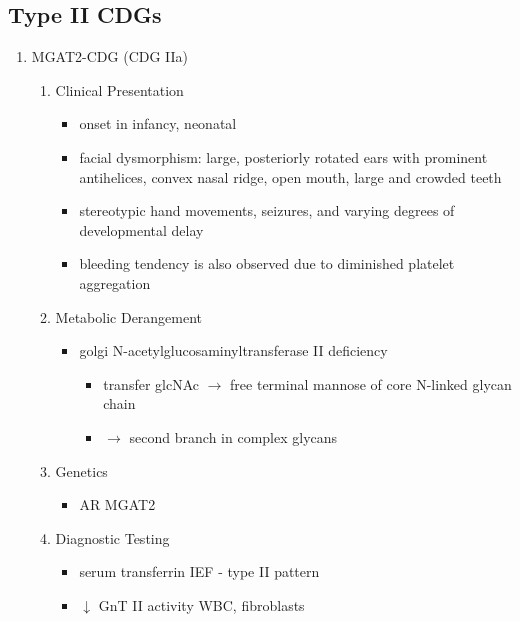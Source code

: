 \documentclass{scrartcl}
\begin{document}
\subsection{Type II CDGs}
\label{sec:org7c0118d}
\begin{enumerate}
\item MGAT2-CDG (CDG IIa)
\label{sec:orgb950941}
\begin{enumerate}
\item Clinical Presentation
\label{sec:org4b41c36}
\begin{itemize}
\item onset in infancy, neonatal
\item facial dysmorphism: large, posteriorly rotated ears with prominent
antihelices, convex nasal ridge, open mouth, large and crowded
teeth
\item stereotypic hand movements, seizures, and varying degrees of
developmental delay
\item bleeding tendency is also observed due to diminished platelet
aggregation
\end{itemize}

\item Metabolic Derangement
\label{sec:org8f324f3}
\begin{itemize}
\item golgi N-acetylglucosaminyltransferase II deficiency
\begin{itemize}
\item transfer glcNAc \(\to\) free terminal mannose of core N-linked glycan chain
\item \(\to\) second branch in complex glycans
\end{itemize}
\end{itemize}
\item Genetics
\label{sec:org929d9af}
\begin{itemize}
\item AR MGAT2
\end{itemize}
\item Diagnostic Testing
\label{sec:org4b76a9b}
\begin{itemize}
\item serum transferrin IEF - type II pattern
\item \(\downarrow\) GnT II activity WBC, fibroblasts
\end{itemize}


\end{enumerate}
\end{enumerate}
\end{document}
